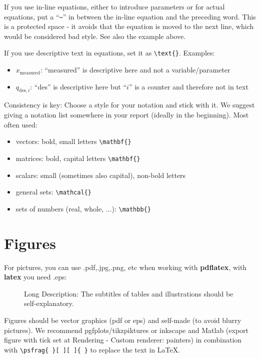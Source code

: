If you use in-line equations, either to introduce parameters or for actual equations, put a ``\verb|~|'' in between the in-line equation and the preceding word. This is a protected space - it avoids that the equation is moved to the next line, which would be considered bad style. See also the example above.

If you use descriptive text in equations, set it as \verb|\text{}|. Examples:
\begin{itemize}
	\item $x_{\text{measured}}$: ``measured'' is descriptive here and not a variable/parameter 
	\item $q_{\text{des},i}$: ``des'' is descriptive here but ``$i$'' is a counter and therefore not in text 
\end{itemize}

Consistency is key: Choose a style for your notation and stick with it. We suggest giving a notation list somewhere in your report (ideally in the beginning). 
Most often used:
\begin{itemize}
	\item vectors: bold, small letters \verb|\mathbf{}|
	\item matrices: bold, capital letters \verb|\mathbf{}|
	\item scalars: small (sometimes also capital), non-bold letters
	\item general sets: \verb|\mathcal{}|
	\item sets of numbers (real, whole, $\ldots$): \verb|\mathbb{}|
\end{itemize}

\section{Figures}

For pictures, you can use .pdf,.jpg,.png, etc when working with \textbf{pdflatex}, with \textbf{latex} you need .eps:
\begin{figure}[htb]
\centering
\caption[Abbreviated Description]{Long Description: The subtitles of tables and illustrations should be self-explanatory.}
\label{fig:abb1}
\end{figure}

Figures should be vector graphics (pdf or eps) and self-made (to avoid blurry pictures). We recommend pgfplots/tikzpiktures or inkscape and Matlab (export figure with tick set at Rendering - Custom renderer: painters) in combination with \verb|\psfrag{ }[ ][ ]{ }| to replace the text in \LaTeX.

